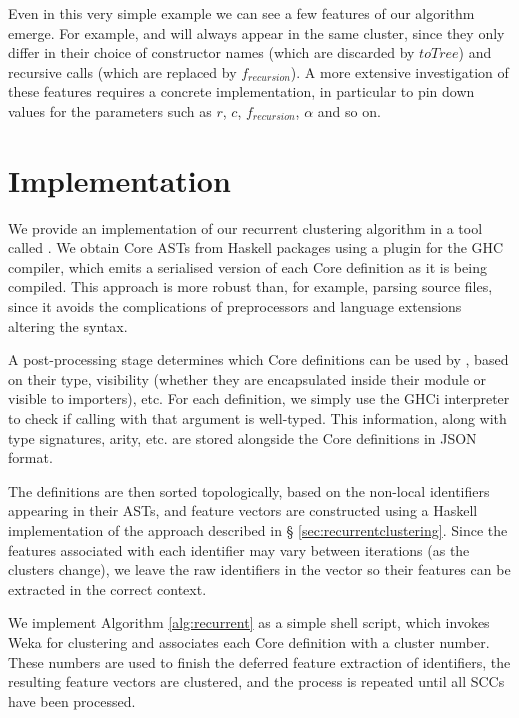 Even in this very simple example we can see a few features of our algorithm
emerge. For example,  and  will always appear in the same
cluster, since they only differ in their choice of constructor names (which are
discarded by $toTree$) and recursive calls (which are replaced by
$f_{recursion}$). A more extensive investigation of these features requires a
concrete implementation, in particular to pin down values for the parameters
such as $r$, $c$, $f_{recursion}$, $\alpha$ and so on.

\section{Implementation}
\label{sec:implementation}

We provide an implementation of our recurrent clustering algorithm in a tool
called \mlforhs{}. We obtain Core ASTs from Haskell packages using a plugin
for the GHC compiler, which emits a serialised version of each Core definition
as it is being compiled. This approach is more robust than, for example, parsing
source files, since it avoids the complications of preprocessors and language
extensions altering the syntax.

A post-processing stage determines which Core definitions can be used by
\quickspec{}, based on their type, visibility (whether they are encapsulated inside
their module or visible to importers), etc. For each definition, we simply use
the GHCi interpreter to check if calling \quickspec{} with that argument is
well-typed. This information, along with type signatures, arity, etc. are stored
alongside the Core definitions in JSON format.

The definitions are then sorted topologically, based on the non-local
identifiers appearing in their ASTs, and feature vectors are constructed using a
Haskell implementation of the approach described in \S
\ref{sec:recurrentclustering}. Since the features associated with each
identifier may vary between iterations (as the clusters change), we leave the
raw identifiers in the vector so their features can be extracted in the correct
context.

We implement Algorithm \ref{alg:recurrent} as a simple shell script, which
invokes Weka for clustering and associates each Core definition with a cluster
number. These numbers are used to finish the deferred feature extraction of
identifiers, the resulting feature vectors are clustered, and the process is
repeated until all SCCs have been processed.

